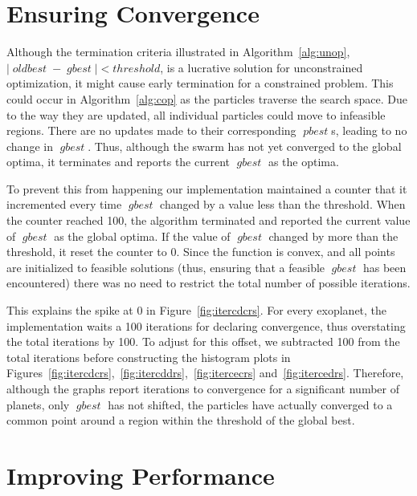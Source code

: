 \documentclass[10pt]{article}
\DeclareMathOperator*{\pbest}{\mathit{pbest}}
\DeclareMathOperator*{\gbest}{\mathit{gbest}}
\DeclareMathOperator*{\oldbest}{\mathit{oldbest}}
\begin{document}
\printbibliography


\begin{appendices}

  \section{Ensuring Convergence}\label{app:con}

  Although the termination criteria illustrated in Algorithm~\ref{alg:unop}, $|\oldbest-\gbest| < \mathit{threshold}$,
  is a lucrative solution for unconstrained optimization, it might cause early termination for a constrained problem.
  This could occur in Algorithm~\ref{alg:cop} as the particles traverse the search space. Due to the way they are
  updated, all individual particles could move to infeasible regions. There are no updates made to their corresponding
  $\pbest$s, leading to no change in $\gbest$. Thus, although the swarm has not yet converged to the global optima, it
  terminates and reports the current $\gbest$ as the optima.

  To prevent this from happening our implementation maintained a counter that it incremented every time $\gbest$ changed
  by a value less than the threshold. When the counter reached \num{100}, the algorithm terminated and reported the
  current value of $\gbest$ as the global optima. If the value of $\gbest$ changed by more than the threshold, it reset
  the counter to $\num{0}$. Since the function is convex, and all points are initialized to feasible solutions (thus,
  ensuring that a feasible $\gbest$ has been encountered) there was no need to restrict the total number of possible
  iterations.

  This explains the spike at \num{0} in Figure~\ref{fig:itercdcrs}. For every exoplanet, the implementation waits a
  \num{100} iterations for declaring convergence, thus overstating the total iterations by \num{100}. To adjust for this
  offset, we subtracted \num{100} from the total iterations before constructing the histogram plots in
  Figures~\ref{fig:itercdcrs},~\ref{fig:itercddrs},~\ref{fig:itercecrs} and~\ref{fig:itercedrs}. Therefore, although the
  graphs report iterations to convergence for a significant number of planets, only $\gbest$ has not shifted, the
  particles have actually converged to a common point around a region within the threshold of the global best.

  \section{Improving Performance}\label{app:imp}


\end{appendices}
\end{document}
